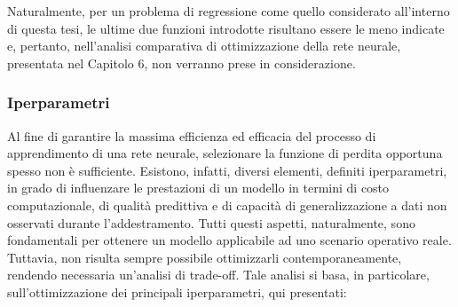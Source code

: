 Naturalmente, per un problema di regressione come quello considerato all'interno di questa tesi, le ultime due funzioni introdotte risultano essere le meno indicate e, pertanto, nell'analisi comparativa di ottimizzazione della rete neurale, presentata nel Capitolo 6, non verranno prese in considerazione.

\subsubsection{Iperparametri\cite{Hyperparameters}}

Al fine di garantire la massima efficienza ed efficacia del processo di apprendimento di una rete neurale, selezionare la funzione di perdita opportuna spesso non è sufficiente. Esistono, infatti, diversi elementi, definiti iperparametri, in grado di influenzare le prestazioni di un modello in termini di costo computazionale, di qualità predittiva e di capacità di generalizzazione a dati non osservati durante l'addestramento. Tutti questi aspetti, naturalmente, sono fondamentali per ottenere un modello applicabile ad uno scenario operativo reale. Tuttavia, non risulta sempre possibile ottimizzarli contemporaneamente, rendendo necessaria un'analisi di trade-off. Tale analisi si basa, in particolare, sull'ottimizzazione dei principali iperparametri, qui presentati:

